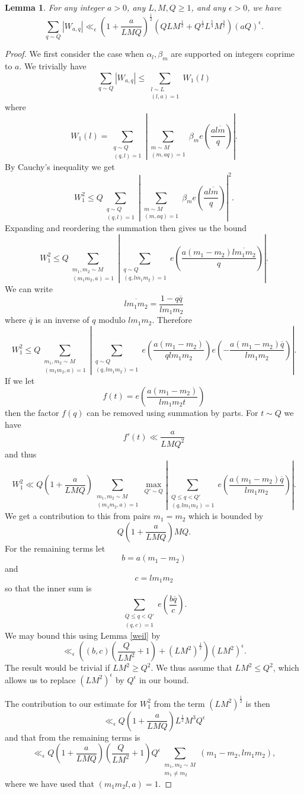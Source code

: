 \documentclass[12pt]{article}
\newcommand{\twosum}[2]{\sum_{\substack{#1\\#2}}}
\newtheorem{lem}[defn]{Lemma}
\begin{document}
\begin{lem}\label{typeiinomax}
For any integer $a>0$, any $L,M,Q\geq 1$, and any  $\epsilon>0$, we have 
$$\sum_{q\sim Q}|W_{a,q}|\ll_\epsilon (1+\frac{a}{LMQ})^{\frac12}(QLM^{\frac12}+Q^{\frac12}L^{\frac54}M^{\frac32})(aQ)^\epsilon.$$
\end{lem}
\begin{proof}
We first consider the case when $\alpha_l,\beta_m$ are supported on integers coprime to $a$.  We trivially have 
$$\sum_{q\sim Q}|W_{a,q}|\leq \twosum{l\sim L}{(l,a)=1}W_1(l)$$
where 
$$W_1(l)=\twosum{q\sim Q}{(q,l)=1}\left|\twosum{m\sim M}{(m,aq)=1}\beta_m e(\frac{a\overline{lm}}{q})\right|.$$
By Cauchy's inequality we get 
$$W_1^2\leq Q\twosum{q\sim Q}{(q,l)=1}\left|\twosum{m\sim M}{(m,aq)=1}\beta_m e(\frac{a\overline{lm}}{q})\right|^2.$$
Expanding and reordering the summation then gives us the bound 
$$W_1^2\leq Q\twosum{m_1,m_2\sim M}{(m_1m_2,a)=1}\left|\twosum{q\sim Q}{(q,lm_1m_2)=1}e(\frac{a(m_1-m_2)\overline{lm_1m_2}}{q})\right|.$$
We can write 
$$\overline{lm_1m_2}=\frac{1-q\overline q}{lm_1m_2}$$
where $\overline q$ is an inverse of $q$ modulo $lm_1m_2$.  Therefore
$$W_1^2\leq Q\twosum{m_1,m_2\sim M}{(m_1m_2,a)=1}\left|\twosum{q\sim
  Q}{(q,lm_1m_2)=1}e\left(\frac{a(m_1-m_2)}{qlm_1m_2}\right)e\left(-\frac{a(m_1-m_2)\overline q}{lm_1m_2}\right)\right|.$$ 
If we let 
$$f(t)=e(\frac{a(m_1-m_2)}{lm_1m_2t})$$
then the factor $f(q)$ can be removed using summation by parts.  For $t\sim Q$ we have 
$$f'(t)\ll \frac{a}{LMQ^2}$$
and thus 
$$W_1^2\ll Q(1+\frac{a}{LMQ})\twosum{m_1,m_2\sim M}{(m_1m_2,a)=1}\max_{Q'\sim Q}\left|\twosum{Q\leq q<Q'}{(q,lm_1m_2)=1}e(\frac{a(m_1-m_2)\overline q}{lm_1m_2})\right|.$$
We get a contribution to this from pairs $m_1=m_2$ which is bounded by 
$$Q(1+\frac{a}{LMQ})MQ.$$
For the remaining terms let 
$$b=a(m_1-m_2)$$
and 
$$c=lm_1m_2$$
so that the inner sum is 
$$\twosum{Q\leq q<Q'}{(q,c)=1}e(\frac{b\overline q}{c}).$$
We may bound this using Lemma \ref{weil} by 
$$\ll_\epsilon ((b,c)(\frac{Q}{LM^2}+1)+(LM^2)^{\frac12})(LM^2)^\epsilon.$$
The result would be trivial if $LM^2\geq Q^2$.  We thus assume 
that $LM^2\leq Q^2$, which allows us to replace $(LM^2)^\epsilon$ by $Q^\epsilon$ in our bound. 

The contribution to our estimate for $W_1^2$ from the term $(LM^2)^{\frac12}$ is then 
$$\ll_\epsilon Q(1+\frac{a}{LMQ})L^{\frac12}M^3 Q^\epsilon$$
and that from the remaining terms is 
$$\ll_\epsilon Q(1+\frac{a}{LMQ})(\frac{Q}{LM^2}+1)Q^\epsilon\twosum{m_1,m_2\sim M}{m_1\ne m_2}(m_1-m_2,lm_1m_2),$$
where we have used that $(m_1m_2l,a)=1$.


\end{proof}
\end{document}
